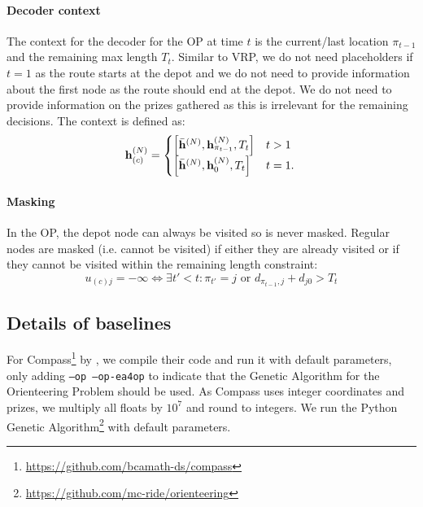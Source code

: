 \paragraph{Decoder context}
The context for the decoder for the OP at time $t$ is the current/last location $\pi_{t-1}$ and the remaining max length $T_t$. Similar to VRP, we do not need placeholders if $t=1$ as the route starts at the depot and we do not need to provide information about the first node as the route should end at the depot. We do not need to provide information on the prizes gathered as this is irrelevant for the remaining decisions. The context is defined as:
\begin{equation}
	\mathbf{h}_{(c)}^{(N)} = \begin{cases}
		\left[\bar{\mathbf{h}}^{(N)} , \mathbf{h}^{(N)}_{\pi_{t-1}} , T_t \right] & t > 1 \\
        \left[\bar{\mathbf{h}}^{(N)} , \mathbf{h}^{(N)}_0 , T_t \right] & t = 1.
\end{cases} \\
\end{equation}

\paragraph{Masking}
In the OP, the depot node can always be visited so is never masked. Regular nodes are masked (i.e. cannot be visited) if either they are already visited or if they cannot be visited within the remaining length constraint:
\begin{equation}
    u_{(c)j} = - \infty \Leftrightarrow \exists t' < t: \pi_{t'} = j \text{ or } d_{\pi_{t-1},j} + d_{j0} > T_t
\end{equation}

\subsection{Details of baselines}
For Compass\footnote{\url{https://github.com/bcamath-ds/compass}} by \citet{kobeaga2018efficient}, we compile their code and run it with default parameters, only adding \texttt{--op --op-ea4op} to indicate that the Genetic Algorithm for the Orienteering Problem should be used. As Compass uses integer coordinates and prizes, we multiply all floats by $10^7$ and round to integers. We run the Python Genetic Algorithm\footnote{\url{https://github.com/mc-ride/orienteering}} with default parameters.

